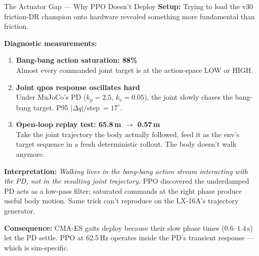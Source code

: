 \documentclass[aspectratio=169]{beamer}
\begin{document}
\begin{frame}{The Actuator Gap --- Why PPO Doesn't Deploy}
\textbf{Setup:} Trying to load the v30 friction-DR champion onto hardware revealed something more fundamental than friction.

\vspace{0.5em}
\textbf{Diagnostic measurements:}
\begin{enumerate}
    \item \textbf{Bang-bang action saturation: 88\%}\\
        Almost every commanded joint target is at the action-space LOW or HIGH.
    \item \textbf{Joint qpos response oscillates hard}\\
        Under MuJoCo's PD ($k_p{=}2.5$, $k_v{=}0.05$), the joint slowly chases the bang-bang target. P95 $|\Delta q|/$step$~= 17^\circ$.
    \item \textbf{Open-loop replay test: 65.8\,m $\rightarrow$ 0.57\,m}\\
        Take the joint trajectory the body actually followed, feed it as the env's target sequence in a fresh deterministic rollout. The body doesn't walk anymore.
\end{enumerate}

\vspace{0.5em}
\textbf{Interpretation:} \emph{Walking lives in the bang-bang action stream interacting with the PD, not in the resulting joint trajectory.} PPO discovered the underdamped PD acts as a low-pass filter; saturated commands at the right phase produce useful body motion. Same trick can't reproduce on the LX-16A's trajectory generator.

\vspace{0.3em}
\textbf{Consequence:} CMA-ES gaits deploy because their slow phase times ($0.6$--$1.4$\,s) let the PD settle. PPO at 62.5\,Hz operates inside the PD's transient response --- which is sim-specific.
\end{frame}
\end{document}
